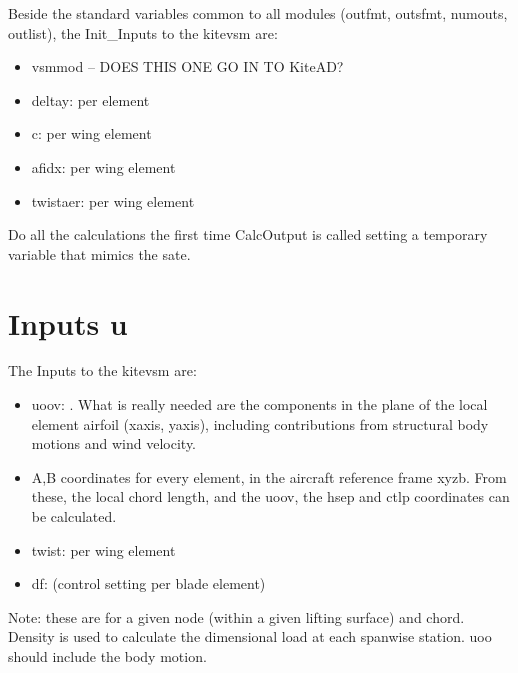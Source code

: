 \documentclass[report]{nrel}
\begin{document}
	Beside the standard variables common to all modules (\gls{outfmt}, \gls{outsfmt}, \gls{numouts}, \gls{outlist}),	the Init\_Inputs to the \gls{kitevsm} are:
	\begin{itemize}
		\item \gls{vsmmod} -- 
		DOES THIS ONE GO IN TO KiteAD?
		
		\item \gls{deltay}:  per element
		\item \gls{c}:  per wing element
		
		\item \gls{afidx}:  per wing element
		\item \gls{twistaer}: per wing element

	\end{itemize}
	
Do all the calculations the first time CalcOutput is called setting a temporary variable that mimics the sate.
	\section{Inputs u}\label{sec:inputs}
	The Inputs to the \gls{kitevsm} are:
	\begin{itemize}
		\item \gls{uoov}: . What is really needed are the components in the plane of the local element airfoil (\gls{xaxis}, \gls{yaxis}), including contributions from structural body motions and wind velocity.

		\item \gls{A},\gls{B} coordinates for every element, in the aircraft reference frame \gls{xyzb}. From these, the local chord length, and the \gls{uoov}, the \gls{hsep} and \gls{ctlp} coordinates can be calculated. 
		\item \gls{twist}:  per wing element
	
		\item \gls{df}:  (control setting per blade element)	

	\end{itemize}
	Note: these are for a given node (within a given lifting surface) and chord. Density is used to calculate the dimensional load at each spanwise station.
	\gls{uoo} should include the body motion.
\end{document}
